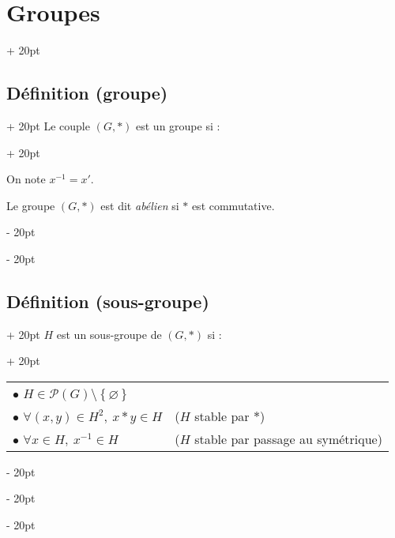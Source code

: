 \documentclass[a4paper, 12pt, twoside]{article}
\newcommand{\ind}[1][20pt]{\advance\leftskip + #1}
\newcommand{\deind}[1][20pt]{\advance\leftskip - #1}
\newenvironment{indentedenv}[1][20pt]{\par \ind[#1]}{\par \deind}
\newenvironment{indt}[2][20pt]{#2 \begin{indentedenv}[#1]}{\end{indentedenv}} %
\begin{document}
\begin{indt}{\section{Groupes}}
\begin{indt}{\subsection{Définition (groupe)}}
\begin{indt}{Le couple $(G, *)$ est un groupe si :}
                \vspace{12pt}
                
                On note $x^{-1} = x'$.
                
                Le groupe $(G, *)$ est dit \textit{abélien} si $*$ est commutative.
            \end{indt}
        \end{indt}
        
        \vspace{6pt}
        
        \begin{indt}{\subsection{Définition (sous-groupe)}}
            \begin{indt}{$H$ est un sous-groupe de $(G, *)$ si :}
                \begin{tabular}{ll}
                    $\bullet$ $H \in \mathcal P(G) \setminus \left\{\varnothing\right\}$
                    \vspace{6pt}
                    \\
                    $\bullet$ $\forall (x, y) \in H^2,\ x * y \in H$
                    & ($H$ stable par $*$)
                    \vspace{6pt}
                    \\
                    $\bullet$ $\forall x \in H,\ x^{-1} \in H$
                    & ($H$ stable par passage au symétrique)
                \end{tabular}
            \end{indt}
        \end{indt}
    \end{indt}
    
    \vspace{6pt}
    
\end{document}
